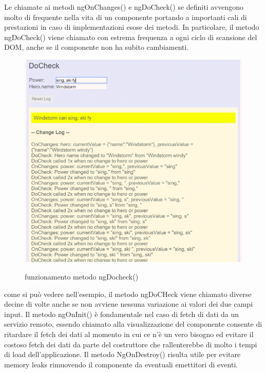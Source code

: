 Le chiamate ai metodi ngOnChanges() e ngDoCheck() se definiti avvengono molto di frequente nella vita di un componente portando a importanti cali di prestazioni in caso di implementazioni esose dei metodi. In particolare, il metodo ngDoCheck() viene chiamato con estrema frequenza a ogni ciclo di scansione del DOM, anche se il componente non ha subito cambiamenti.
\begin{figure}[H]
    \centering
 \includegraphics[scale=0.5]{resources/doCheck.png}
 \cite{angular-doc}
    \caption{funzionamento metodo ngDocheck()}
\end{figure}
come si può vedere nell'esempio, il metodo  ngDoCHeck viene chiamato diverse decine di volte anche se non avviene nessuna variazione ai valori dei due campi input.
\newline
Il metodo ngOnInit() è fondamentale nel caso di fetch di dati da un servizio remoto, essendo chiamato alla visualizzazione del componente consente di ritardare il fetch dei dati al momento in cui ce n'è un vero bisogno ed evitare il costoso fetch dei dati da parte del costruttore che rallenterebbe di molto i tempi di load dell'applicazione.
\newline
\newline
Il metodo NgOnDestroy() risulta utile per evitare memory leaks rimuovendo il componente da eventuali emettitori di eventi.
